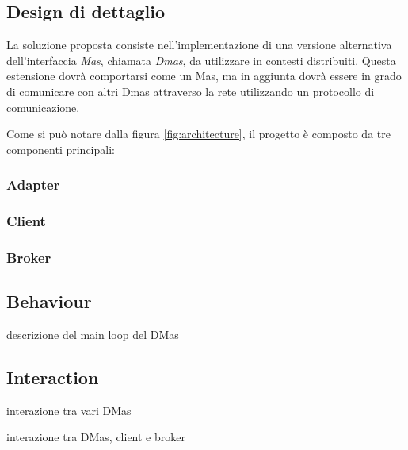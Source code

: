 \subsection{Design di dettaglio}
La soluzione proposta consiste nell'implementazione di una versione alternativa dell'interfaccia \textit{Mas}, chiamata \textit{Dmas}, da utilizzare in contesti distribuiti.
Questa estensione dovrà comportarsi come un Mas, ma in aggiunta dovrà essere in grado di comunicare con altri Dmas attraverso la rete utilizzando un protocollo di comunicazione.

Come si può notare dalla figura \ref{fig:architecture}, il progetto è composto da tre componenti principali:

\subsubsection{Adapter}

\subsubsection{Client}

\subsubsection{Broker}


\subsection{Behaviour}

descrizione del main loop del DMas

\subsection{Interaction}

interazione tra vari DMas

interazione tra DMas, client e broker
